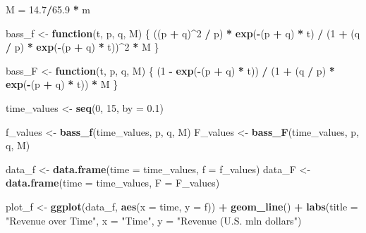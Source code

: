 \documentclass[
]{article}
\newenvironment{Shaded}{\begin{snugshade}}{\end{snugshade}}
\newcommand{\AttributeTok}[1]{\textcolor[rgb]{0.13,0.29,0.53}{#1}}
\newcommand{\ControlFlowTok}[1]{\textcolor[rgb]{0.13,0.29,0.53}{\textbf{#1}}}
\newcommand{\DecValTok}[1]{\textcolor[rgb]{0.00,0.00,0.81}{#1}}
\newcommand{\FloatTok}[1]{\textcolor[rgb]{0.00,0.00,0.81}{#1}}
\newcommand{\FunctionTok}[1]{\textcolor[rgb]{0.13,0.29,0.53}{\textbf{#1}}}
\newcommand{\NormalTok}[1]{#1}
\newcommand{\OtherTok}[1]{\textcolor[rgb]{0.56,0.35,0.01}{#1}}
\newcommand{\SpecialCharTok}[1]{\textcolor[rgb]{0.81,0.36,0.00}{\textbf{#1}}}
\newcommand{\StringTok}[1]{\textcolor[rgb]{0.31,0.60,0.02}{#1}}
\begin{document}
\begin{Shaded}
\begin{Highlighting}[]
\NormalTok{M }\OtherTok{=} \FloatTok{14.7}\SpecialCharTok{/}\FloatTok{65.9} \SpecialCharTok{*}\NormalTok{ m}

\NormalTok{bass\_f }\OtherTok{\textless{}{-}} \ControlFlowTok{function}\NormalTok{(t, p, q, M) \{}
\NormalTok{  ((p }\SpecialCharTok{+}\NormalTok{ q)}\SpecialCharTok{\^{}}\DecValTok{2} \SpecialCharTok{/}\NormalTok{ p) }\SpecialCharTok{*} \FunctionTok{exp}\NormalTok{(}\SpecialCharTok{{-}}\NormalTok{(p }\SpecialCharTok{+}\NormalTok{ q) }\SpecialCharTok{*}\NormalTok{ t) }\SpecialCharTok{/}\NormalTok{ (}\DecValTok{1} \SpecialCharTok{+}\NormalTok{ (q }\SpecialCharTok{/}\NormalTok{ p) }\SpecialCharTok{*} \FunctionTok{exp}\NormalTok{(}\SpecialCharTok{{-}}\NormalTok{(p }\SpecialCharTok{+}\NormalTok{ q) }\SpecialCharTok{*}\NormalTok{ t))}\SpecialCharTok{\^{}}\DecValTok{2} \SpecialCharTok{*}\NormalTok{ M}
\NormalTok{\}}

\NormalTok{bass\_F }\OtherTok{\textless{}{-}} \ControlFlowTok{function}\NormalTok{(t, p, q, M) \{}
\NormalTok{  (}\DecValTok{1} \SpecialCharTok{{-}} \FunctionTok{exp}\NormalTok{(}\SpecialCharTok{{-}}\NormalTok{(p }\SpecialCharTok{+}\NormalTok{ q) }\SpecialCharTok{*}\NormalTok{ t)) }\SpecialCharTok{/}\NormalTok{ (}\DecValTok{1} \SpecialCharTok{+}\NormalTok{ (q }\SpecialCharTok{/}\NormalTok{ p) }\SpecialCharTok{*} \FunctionTok{exp}\NormalTok{(}\SpecialCharTok{{-}}\NormalTok{(p }\SpecialCharTok{+}\NormalTok{ q) }\SpecialCharTok{*}\NormalTok{ t)) }\SpecialCharTok{*}\NormalTok{ M}
\NormalTok{\}}

\NormalTok{time\_values }\OtherTok{\textless{}{-}} \FunctionTok{seq}\NormalTok{(}\DecValTok{0}\NormalTok{, }\DecValTok{15}\NormalTok{, }\AttributeTok{by =} \FloatTok{0.1}\NormalTok{)}

\NormalTok{f\_values }\OtherTok{\textless{}{-}} \FunctionTok{bass\_f}\NormalTok{(time\_values, p, q, M)}
\NormalTok{F\_values }\OtherTok{\textless{}{-}} \FunctionTok{bass\_F}\NormalTok{(time\_values, p, q, M)}

\NormalTok{data\_f }\OtherTok{\textless{}{-}} \FunctionTok{data.frame}\NormalTok{(}\AttributeTok{time =}\NormalTok{ time\_values, }\AttributeTok{f =}\NormalTok{ f\_values)}
\NormalTok{data\_F }\OtherTok{\textless{}{-}} \FunctionTok{data.frame}\NormalTok{(}\AttributeTok{time =}\NormalTok{ time\_values, }\AttributeTok{F =}\NormalTok{ F\_values)}

\NormalTok{plot\_f }\OtherTok{\textless{}{-}} \FunctionTok{ggplot}\NormalTok{(data\_f, }\FunctionTok{aes}\NormalTok{(}\AttributeTok{x =}\NormalTok{ time, }\AttributeTok{y =}\NormalTok{ f)) }\SpecialCharTok{+}
  \FunctionTok{geom\_line}\NormalTok{() }\SpecialCharTok{+}
  \FunctionTok{labs}\NormalTok{(}\AttributeTok{title =} \StringTok{"Revenue over Time"}\NormalTok{, }\AttributeTok{x =} \StringTok{"Time"}\NormalTok{, }\AttributeTok{y =} \StringTok{"Revenue (U.S. mln dollars"}\NormalTok{)}


\end{Highlighting}
\end{Shaded}
\end{document}

